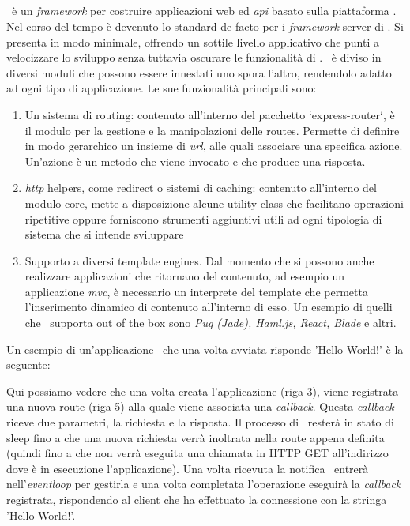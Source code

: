 \subsection{\expressjs}
\expressjs~è un \textit{\gls{framework}} per costruire applicazioni web ed \textit{\acrshort{api}} basato sulla piattaforma \nodejs. Nel corso del tempo è devenuto lo standard de facto per i \textit{\gls{framework}} server di \nodejs. 
Si presenta in modo minimale, offrendo un sottile livello applicativo che punti a velocizzare lo sviluppo senza tuttavia oscurare le funzionalità di \nodejs. \expressjs~è diviso in diversi moduli che possono essere innestati uno spora l'altro, rendendolo adatto ad ogni tipo di applicazione.  
Le sue funzionalità principali sono:
\begin{enumerate}[label=(\alph*)]
	\item Un sistema di routing: contenuto all'interno del pacchetto `express-router`, è il modulo per la gestione e la manipolazioni delle routes. Permette di definire in modo gerarchico un insieme di \textit{\acrshort{url}}, alle quali associare una specifica azione. Un'azione è un metodo che viene invocato e che produce una risposta.
	\item \textit{\acrshort{http}} helpers, come redirect o sistemi di caching: contenuto all'interno del modulo core, mette a disposizione alcune utility class che facilitano operazioni ripetitive oppure forniscono strumenti aggiuntivi utili ad ogni tipologia di sistema che si intende sviluppare
	\item Supporto a diversi template engines. Dal momento che si possono anche realizzare applicazioni che ritornano del contenuto, ad esempio un applicazione \textit{\gls{mvc}}, è necessario un interprete del template che permetta l'inserimento dinamico di contenuto all'interno di esso. Un esempio di quelli che \expressjs~supporta out of the box sono \textit{Pug (Jade), Haml.js, React, Blade} e altri.
\end{enumerate}

\noindent
Un esempio di un'applicazione \expressjs~che una volta avviata risponde 'Hello World!' è la seguente:

Qui possiamo vedere che una volta creata l'applicazione (riga 3), viene registrata una nuova route (riga 5) alla quale viene associata una \textit{\gls{callback}}. Questa \textit{\gls{callback}} riceve due parametri, la richiesta e la risposta. Il processo di \nodejs~resterà in stato di sleep fino a che una nuova richiesta verrà inoltrata nella route appena definita (quindi fino a che non verrà eseguita una chiamata in HTTP GET all'indirizzo dove è in esecuzione l'applicazione). Una volta ricevuta la notifica \nodejs~entrerà nell'\textit{\gls{eventloop}} per gestirla e una volta completata l'operazione eseguirà la \textit{\gls{callback}} registrata, rispondendo al client che ha effettuato la connessione con la stringa 'Hello World!'.

\subsection{\mongodb}
\subsection{\angular}